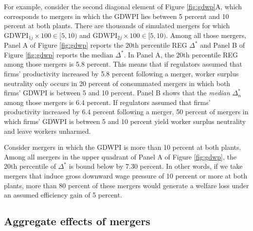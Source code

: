 \documentclass[12pt]{article}
\theoremstyle{prop}
\begin{document}
For example, consider the second diagonal element of Figure \ref{fig:gdwp}A, which corresponds to mergers in which the GDWPI lies between 5 percent and 10 percent at both plants. 
There are thousands of simulated mergers for which $\text{GDWPI}_{1j}\times100\in[5,10)$ and $\text{GDWPI}_{2j}\times100\in[5,10)$.
Among all those mergers, Panel A  of Figure \ref{fig:gdwp} reports the 20th percentile REG $\Delta^*$  and  Panel B  of Figure \ref{fig:gdwp} reports the median  $\Delta^*$. 
In Panel A, the 20th percentile REG among those mergers is 5.8 percent. 
This means that if regulators assumed that firms' productivity increased by 5.8 percent following a merger, worker surplus neutrality only occurs in 20 percent of consummated mergers in which both firms' GDWPI is between 5 and 10 percent.  
Panel B shows that the \textit{median} $\Delta_n^*$ among those mergers is 6.4 percent. 
If regulators assumed that firms' productivity increased by 6.4 percent following a merger, 50 percent of mergers in which firms' GDWPI is between 5 and 10 percent yield worker surplus neutrality and leave workers unharmed.  
 
Consider mergers in which the GDWPI is more than 10 percent at both plants. 
Among all mergers in the upper quadrant of Panel A  of Figure \ref{fig:gdwp}, the 20th percentile of  $\Delta^*$ is bound below by 7.30 percent.
In other words, if we take mergers that induce gross downward wage pressure of 10 percent or more at both plants, more than 80 percent of these mergers would generate a welfare loss under an assumed efficiency gain of 5 percent.
 
\subsection{Aggregate effects of mergers}
\end{document}
